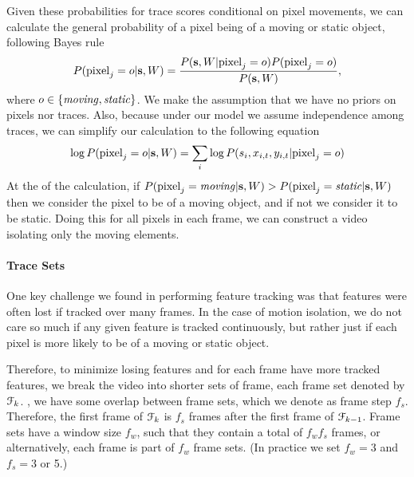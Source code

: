 Given these probabilities for trace scores conditional on pixel movements, we
can calculate the general probability of a pixel being of a moving or static
object, following Bayes rule
\begin{align}
	P({\rm pixel}_j = o|{\bf s},W) = \frac{ P({\bf s},W|{\rm pixel}_j = o) P({\rm pixel}_j = o) }{ P({\bf s}, W) },
\end{align}
where $o \in \{ {\it moving}, {\it static} \}$.  We make the assumption that we
have no priors on pixels nor traces.  Also, because under our model we assume
independence among traces, we can simplify our calculation to the following equation
\begin{align}
	\log P({\rm pixel}_j = o|{\bf s},W) = \sum_i \log P(s_i,x_{i,t},y_{i,t}|{\rm pixel}_j = o) \label{eq:logsum}
\end{align}
At the of the calculation, if $P({\rm pixel}_j = {\it moving}|{\bf s},W) > P({\rm
pixel}_j = {\it static}|{\bf s},W)$ then we consider the pixel to be of a moving object,
and if not we consider it to be static.  Doing this for all pixels in each
frame, we can construct a video isolating only the moving elements.



\paragraph{Trace Sets} %
\label{par:Trace Sets}

One key challenge we found in performing feature tracking was that features
were often lost if tracked over many frames.  In the case of motion
isolation, we do not care so much if any given feature is tracked continuously,
but rather just if each pixel is more likely to be of a moving or static
object.


\newcommand{\fset}{ \EuScript{F} }
\newcommand{\fstep}{ f_s }
\newcommand{\fwin}{ f_w }

Therefore, to minimize losing features and for each frame have more tracked
features, we break the video into shorter sets of frame, each frame set denoted by
$\fset_k$.  ,
we have some overlap between frame sets, which we denote as frame step
$\fstep$.  Therefore, the first frame of $\fset_k$ is $\fstep$ frames after the
first frame of $\fset_{k-1}$. Frame sets have a window size $\fwin$, such that
they contain a total of $\fwin\fstep$ frames, or alternatively, each frame is
part of $\fwin$ frame sets.
(In practice we set $\fwin = 3$ and $\fstep = 3$ or 5.)

